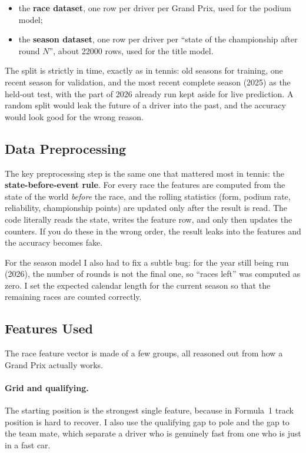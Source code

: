 \documentclass[10pt,twocolumn]{article}
\begin{document}
\begin{itemize}[leftmargin=1.2em,itemsep=2pt]
  \item the \textbf{race dataset}, one row per driver per Grand Prix, used for
        the podium model;
  \item the \textbf{season dataset}, one row per driver per ``state of the
        championship after round \(N\)'', about \num{22000} rows, used for the
        title model.
\end{itemize}

The split is strictly in time, exactly as in tennis: old seasons for training,
one recent season for validation, and the most recent complete season (2025) as
the held-out test, with the part of 2026 already run kept aside for live
prediction. A random split would leak the future of a driver into the past, and
the accuracy would look good for the wrong reason.

\subsection{Data Preprocessing}
The key preprocessing step is the same one that mattered most in tennis: the
\textbf{state-before-event rule}. For every race the features are computed from
the state of the world \emph{before} the race, and the rolling statistics
(form, podium rate, reliability, championship points) are updated only after the
result is read. The code literally reads the state, writes the feature row, and
only then updates the counters. If you do these in the wrong order, the result
leaks into the features and the accuracy becomes fake.

For the season model I also had to fix a subtle bug: for the year still being
run (2026), the number of rounds is not the final one, so ``races left'' was
computed as zero. I set the expected calendar length for the current season so
that the remaining races are counted correctly.

\subsection{Features Used}
The race feature vector is made of a few groups, all reasoned out from how a
Grand Prix actually works.

\paragraph{Grid and qualifying.} The starting position is the strongest single
feature, because in Formula~1 track position is hard to recover. I also use the
qualifying gap to pole and the gap to the team mate, which separate a driver who
is genuinely fast from one who is just in a fast car.
\end{document}
